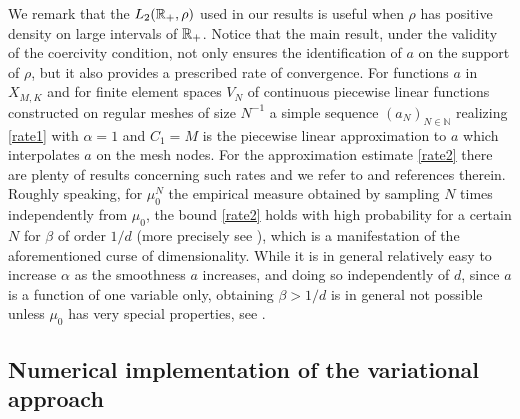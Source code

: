 We  remark that the $L_2(\mathbb{R}_+,\rho)$ used in our results is useful when $\rho$ has positive density on large intervals of $\mathbb{R}_+$.
Notice that the main result, under the validity of the coercivity condition, not only ensures the identification of $a$ on the support of $\rho$, but it also provides a prescribed rate of convergence.
For functions $a$ in $X_{M,K}$ and for finite element spaces $V_N$ of continuous piecewise linear functions constructed on regular meshes of size $N^{-1}$ a simple sequence $(a_N)_{N \in \mathbb N}$  realizing \eqref{rate1} with $\alpha=1$ and $C_1=M$ is the piecewise linear approximation to $a$ which interpolates $a$ on the mesh nodes. For the approximation estimate \eqref{rate2} there are plenty of results
concerning such rates and we refer to \cite{descsc13} and references therein. Roughly speaking, for $\mu_0^N$ the empirical measure obtained by sampling $N$ times independently from $\mu_0$, the bound \eqref{rate2} holds with high probability for a certain $N$ for $\beta$ of order $1/d$ (more precisely see \cite[Theorem 1]{descsc13}), which is a manifestation of the aforementioned curse of dimensionality. While it is in general relatively easy to increase $\alpha$ as the smoothness $a$ increases, and doing so independently of $d$, since $a$ is a function of one variable only, obtaining $\beta>1/d$ is in general not possible unless $\mu_0$ has very special properties, see \cite[Section 4.4 and Section 4.5]{fohavy11}.



\subsection{Numerical implementation of the variational approach }\label{sec:wp3}


